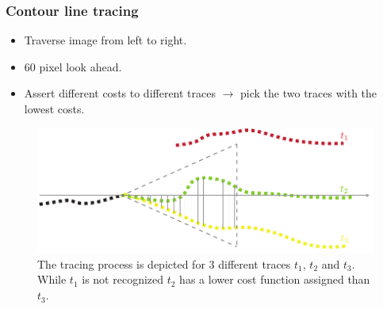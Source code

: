 \documentclass{beamer}
\begin{document}
\begin{frame}
	[fragile] \frametitle{Contour line tracing} 
	\begin{itemize}
		\item Traverse image from left to right. 
		\item 60 pixel look ahead. 
		\item Assert different costs to different traces $\rightarrow$ pick the two traces with the lowest costs. 
	\end{itemize}
	\begin{figure}
		[ht] \centering 
		\includegraphics[width=0.79
		\textwidth]{../report/iris/trace} \caption{The tracing process is depicted for 3 different traces $t_1$, $t_2$ and $t_3$. While $t_1$ is not recognized $t_2$ has a lower cost function assigned than $t_3$.} \label{fig:trace} 
	\end{figure}
\end{frame}
\end{document}
